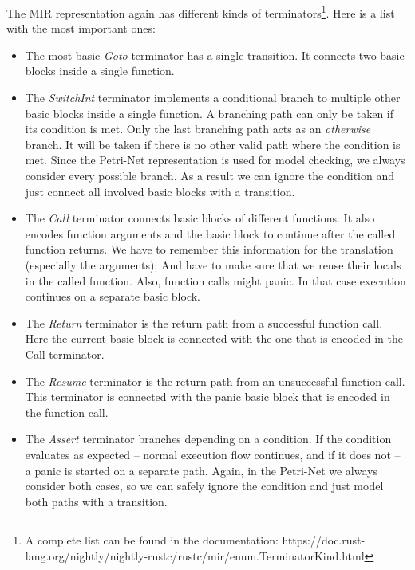 The MIR representation again has different kinds of terminators\footnote{A complete list can be found in the documentation: https://doc.rust-lang.org/nightly/nightly-rustc/rustc/mir/enum.TerminatorKind.html}. Here is a list with the most important ones:
\begin{itemize}
    \item The most basic \textit{Goto} terminator has a single transition.
    It connects two basic blocks inside a single function.
    \item The \textit{SwitchInt} terminator implements a conditional branch to multiple other basic blocks inside a single function.
    A branching path can only be taken if its condition is met.
    Only the last branching path acts as an \textit{otherwise} branch.
    It will be taken if there is no other valid path where the condition is met.
    Since the Petri-Net representation is used for model checking, we always consider every possible branch.
    As a result we can ignore the condition and just connect all involved basic blocks with a transition.
    \item The \textit{Call} terminator connects basic blocks of different functions.
    It also encodes function arguments and the basic block to continue after the called function returns.
    We have to remember this information for the translation (especially the arguments);
    And have to make sure that we reuse their locals in the called function.
    Also, function calls might panic.
    In that case execution continues on a separate basic block.
    \item The \textit{Return} terminator is the return path from a successful function call.
    Here the current basic block is connected with the one that is encoded in the Call terminator.
    \item The \textit{Resume} terminator is the return path from an unsuccessful function call.
    This terminator is connected with the panic basic block that is encoded in the function call.
    \item The \textit{Assert} terminator branches depending on a condition.
    If the condition evaluates as expected -- normal execution flow continues, and if it does not -- a panic is started on a separate path.
    Again, in the Petri-Net we always consider both cases, so we can safely ignore the condition and just model both paths with a transition.
\end{itemize}

